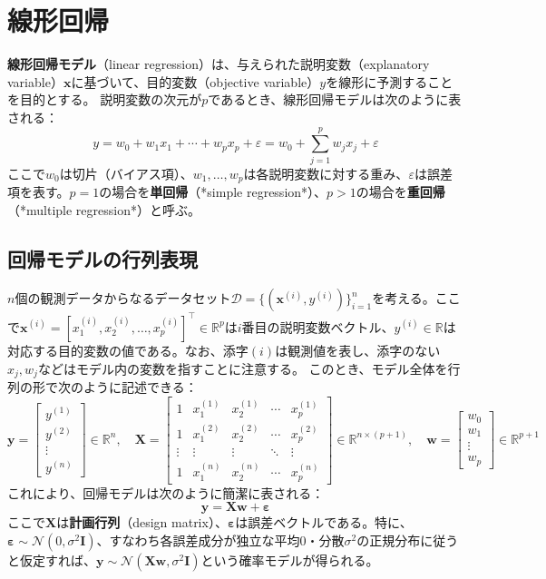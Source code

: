 \section{線形回帰}
\textbf{線形回帰モデル}（linear regression）は、与えられた説明変数（explanatory variable）$\mathbf{x}$に基づいて、目的変数（objective variable）$y$を線形に予測することを目的とする。
説明変数の次元が$p$であるとき、線形回帰モデルは次のように表される：
\begin{equation}
y = w_0 + w_1x_1 + \cdots + w_px_p + \varepsilon = w_0 + \sum_{j=1}^p w_j x_j + \varepsilon
\end{equation}
ここで$w_0$は切片（バイアス項）、$w_1, \dots, w_p$は各説明変数に対する重み、$\varepsilon$は誤差項を表す。$p = 1$の場合を\textbf{単回帰}（*simple regression*）、$p > 1$の場合を\textbf{重回帰}（*multiple regression*）と呼ぶ。
\subsection{回帰モデルの行列表現}
$n$個の観測データからなるデータセット$\mathcal{D} = \{(\mathbf{x}^{(i)}, y^{(i)})\}_{i=1}^n$を考える。ここで$\mathbf{x}^{(i)} = [x_1^{(i)}, x_2^{(i)}, \dots, x_p^{(i)}]^\top \in \mathbb{R}^p$は$i$番目の説明変数ベクトル、$y^{(i)} \in \mathbb{R}$は対応する目的変数の値である。なお、添字$(i)$は観測値を表し、添字のない$x_j, w_j$などはモデル内の変数を指すことに注意する。
このとき、モデル全体を行列の形で次のように記述できる：
\begin{equation}
\mathbf{y} = \begin{bmatrix} y^{(1)} \\ y^{(2)} \\ \vdots \\ y^{(n)} \end{bmatrix} \in \mathbb{R}^n,\quad
\mathbf{X} = \begin{bmatrix} 1 & x_1^{(1)} & x_2^{(1)} & \cdots & x_p^{(1)} \\
1 & x_1^{(2)} & x_2^{(2)} & \cdots & x_p^{(2)} \\
\vdots & \vdots & \vdots & \ddots & \vdots \\
1 & x_1^{(n)} & x_2^{(n)} & \cdots & x_p^{(n)} \end{bmatrix} \in \mathbb{R}^{n \times (p+1)},\quad
\mathbf{w} = \begin{bmatrix} w_0 \\ w_1 \\ \vdots \\ w_p \end{bmatrix} \in \mathbb{R}^{p+1}
\end{equation}
これにより、回帰モデルは次のように簡潔に表される：
\begin{equation}
\mathbf{y} = \mathbf{X} \mathbf{w} + \boldsymbol{\varepsilon}
\end{equation}
ここで$\mathbf{X}$は\textbf{計画行列}（design matrix）、$\boldsymbol{\varepsilon}$は誤差ベクトルである。特に、$\boldsymbol{\varepsilon} \sim \mathcal{N}(0, \sigma^2 \mathbf{I})$、すなわち各誤差成分が独立な平均0・分散$\sigma^2$の正規分布に従うと仮定すれば、$\mathbf{y} \sim \mathcal{N}(\mathbf{X} \mathbf{w}, \sigma^2 \mathbf{I})$という確率モデルが得られる。
